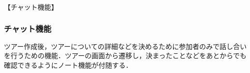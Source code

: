 【チャット機能】
\par
\subsubsection{チャット機能}
\par
ツアー作成後，ツアーについての詳細などを決めるために参加者のみで話し合いを行うための機能．ツアーの画面から遷移し，決まったことなどをあとからでも確認できるようにノート機能が付随する．

